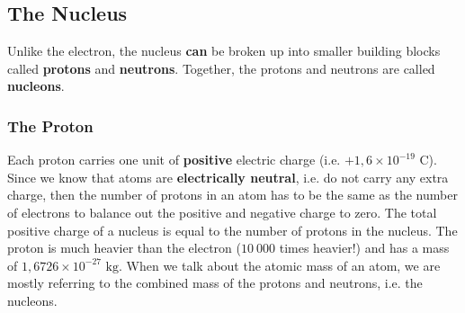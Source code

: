             \subsection*{The Nucleus}
            \nopagebreak
Unlike the electron, the nucleus \textbf{can} be broken up into smaller building blocks called \textbf{protons} and \textbf{neutrons}. Together, the protons and neutrons are called \textbf{nucleons}.
        \label{m38745*uid12}
            \subsubsection*{The Proton}
            \nopagebreak
          \label{m38745*id255338}Each proton carries one unit of \textbf{positive} electric charge (i.e. $+1,6 \times {10}^{-19} \text{ C}$).
Since we know that atoms are \textbf{electrically neutral}, i.e. do not carry any extra charge, then the number of protons in an atom has to be the same as the number of electrons to balance out the positive and negative charge to zero. The total positive charge of a nucleus is equal to the number of protons in the nucleus. The proton is much heavier than the electron ($10~000$ times heavier!) and has a mass of $1,6726 \times {10}^{-27} \text{ kg}$. When we talk about the atomic mass of an atom, we are mostly referring to the combined mass of the protons and neutrons, i.e. the nucleons.
        \label{m38745*uid13}
